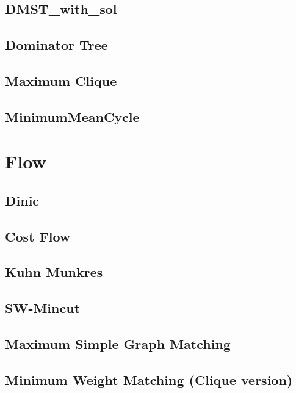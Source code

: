 \documentclass[a4paper,10pt,twocolumn,oneside]{article}
\begin{document}
\subsection{DMST\_with\_sol}

\subsection{Dominator Tree}

\subsection{Maximum Clique}

\subsection{MinimumMeanCycle}


\section{Flow}
\subsection{Dinic} %

\subsection{Cost Flow} %

\subsection{Kuhn Munkres}

\subsection{SW-Mincut}

\subsection{Maximum Simple Graph Matching}

\subsection{Minimum Weight Matching (Clique version)}

\end{document}
